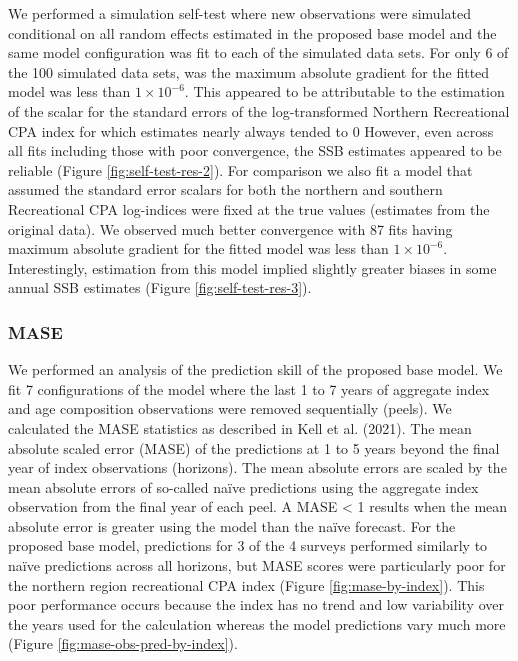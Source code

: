 \documentclass[
]{article}
\begin{document}
We performed a simulation self-test where new observations were simulated conditional on all random effects estimated in the proposed base model and the same model configuration was fit to each of the simulated data sets. For only 6 of the 100 simulated data sets, was the maximum absolute gradient for the fitted model was less than \(1\times10^{-6}\). This appeared to be attributable to the estimation of the scalar for the standard errors of the log-transformed Northern Recreational CPA index for which estimates nearly always tended to 0 However, even across all fits including those with poor convergence, the SSB estimates appeared to be reliable (Figure \ref{fig:self-test-res-2}). For comparison we also fit a model that assumed the standard error scalars for both the northern and southern Recreational CPA log-indices were fixed at the true values (estimates from the original data). We observed much better convergence with 87 fits having maximum absolute gradient for the fitted model was less than \(1\times10^{-6}\). Interestingly, estimation from this model implied slightly greater biases in some annual SSB estimates (Figure \ref{fig:self-test-res-3}).

\hypertarget{mase}{%
\subsubsection{MASE}\label{mase}}

We performed an analysis of the prediction skill of the proposed base model. We fit 7 configurations of the model where the last 1 to 7 years of aggregate index and age composition observations were removed sequentially (peels). We calculated the MASE statistics as described in Kell et al. (2021). The mean absolute scaled error (MASE) of the predictions at 1 to 5 years beyond the final year of index observations (horizons). The mean absolute errors are scaled by the mean absolute errors of so-called naïve predictions using the aggregate index observation from the final year of each peel. A MASE \textless{} 1 results when the mean absolute error is greater using the model than the naïve forecast. For the proposed base model, predictions for 3 of the 4 surveys performed similarly to naïve predictions across all horizons, but MASE scores were particularly poor for the northern region recreational CPA index (Figure \ref{fig:mase-by-index}). This poor performance occurs because the index has no trend and low variability over the years used for the calculation whereas the model predictions vary much more (Figure \ref{fig:mase-obs-pred-by-index}).
\end{document}
